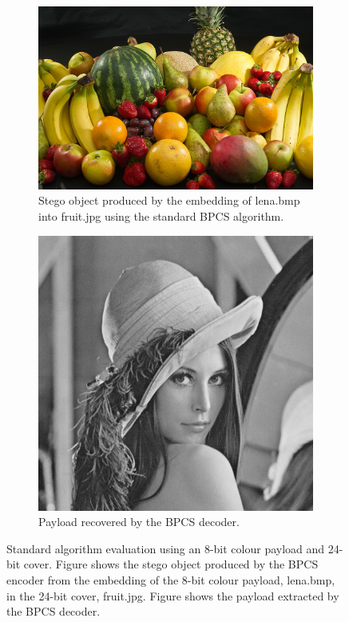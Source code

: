 \documentclass{l4proj}
\begin{document}
\begin{figure}[]
    \centering
    \begin{subfigure}[b]{0.4\textwidth}
        \includegraphics[width=\textwidth]{images/lena_in_fruit_stego.png}
        \caption{Stego object produced by the embedding of lena.bmp into fruit.jpg using the standard BPCS algorithm.}
        \label{fig:stego_grayincolour}
    \end{subfigure}
    \begin{subfigure}[b]{0.4\textwidth}
        \includegraphics[width=\textwidth]{images/lena.png}
        \caption{Payload recovered by the BPCS decoder.}
        \label{fig:extracted_lena}
    \end{subfigure}
    \caption{Standard algorithm evaluation using an 8-bit colour payload and 24-bit cover. Figure  shows the stego object produced by the BPCS encoder from the embedding of the 8-bit colour payload, lena.bmp, in the 24-bit cover, fruit.jpg. Figure  shows the payload extracted by the BPCS decoder.}
\end{figure}
\end{document}
